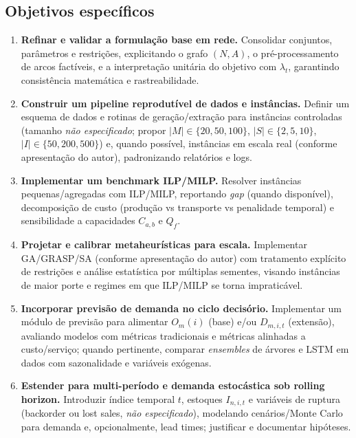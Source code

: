 \subsection*{Objetivos específicos}

\begin{enumerate}
  \item \textbf{Refinar e validar a formulação base em rede.} Consolidar conjuntos, parâmetros e restrições, explicitando o grafo \((N,A)\), o pré-processamento de arcos factíveis, e a interpretação unitária do objetivo com \(\lambda_t\), garantindo consistência matemática e rastreabilidade. \cite{AhujaMagnantiOrlin1993NetworkFlows,Shapiro2001ModelingSupplyChain}

  \item \textbf{Construir um pipeline reprodutível de dados e instâncias.} Definir um esquema de dados e rotinas de geração/extração para instâncias controladas (tamanho \emph{não especificado}; propor \(|M|\in\{20,50,100\}\), \(|S|\in\{2,5,10\}\), \(|I|\in\{50,200,500\}\)) e, quando possível, instâncias em escala real (conforme apresentação do autor), padronizando relatórios e logs.

  \item \textbf{Implementar um benchmark ILP/MILP.} Resolver instâncias pequenas/agregadas com ILP/MILP, reportando \emph{gap} (quando disponível), decomposição de custo (produção vs transporte vs penalidade temporal) e sensibilidade a capacidades \(C_{a,b}\) e \(Q_f\). \cite{Shapiro2001ModelingSupplyChain}

  \item \textbf{Projetar e calibrar metaheurísticas para escala.} Implementar GA/GRASP/SA (conforme apresentação do autor) com tratamento explícito de restrições e análise estatística por múltiplas sementes, visando instâncias de maior porte e regimes em que ILP/MILP se torna impraticável. \cite{Talbi2009Metaheuristics}

  \item \textbf{Incorporar previsão de demanda no ciclo decisório.} Implementar um módulo de previsão para alimentar \(O_m(i)\) (base) e/ou \(D_{m,i,t}\) (extensão), avaliando modelos com métricas tradicionais e métricas alinhadas a custo/serviço; quando pertinente, comparar \emph{ensembles} de árvores e LSTM em dados com sazonalidade e variáveis exógenas. \cite{Nasseri2023RetailDemandPrediction,TadayonradNdiaye2023KPIDemandForecasting}

  \item \textbf{Estender para multi-período e demanda estocástica sob rolling horizon.} Introduzir índice temporal \(t\), estoques \(I_{n,i,t}\) e variáveis de ruptura (backorder ou lost sales, \emph{não especificado}), modelando cenários/Monte Carlo para demanda e, opcionalmente, lead times; justificar e documentar hipóteses. \cite{BirgeLouveaux2011StochasticProgramming,Law2015SimulationModeling}


\end{enumerate}
